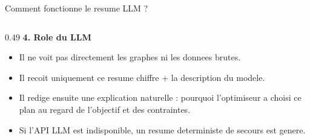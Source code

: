 \documentclass{beamer}
\begin{document}
\begin{frame}{Comment fonctionne le resume LLM ?}
\begin{columns}[T]
\begin{column}{0.49\textwidth}
\vspace{0.4em}
\textbf{4. Role du LLM}
\begin{itemize}
\item Il ne voit pas directement les graphes ni les donnees brutes.
\item Il recoit uniquement ce resume chiffre + la description du modele.
\item Il redige ensuite une explication naturelle : \og pourquoi l'optimiseur a choisi ce plan\fg{} au regard de l'objectif et des contraintes.
\item Si l'API LLM est indisponible, un resume deterministe de secours est genere.
\end{itemize}
\end{column}
\end{columns}
\end{frame}
\end{document}
